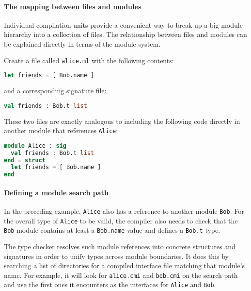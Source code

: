 \hypertarget{the-mapping-between-files-and-modules}{%
\paragraph{The mapping between files and
modules}\label{the-mapping-between-files-and-modules}}

Individual compilation units provide a convenient way to break up a big
module hierarchy into a collection of files. The relationship between
files and modules can be explained directly in terms of the module
system. 

Create a file called \passthrough{\lstinline!alice.ml!} with the
following contents:

\begin{lstlisting}[language=Caml]
let friends = [ Bob.name ]
\end{lstlisting}

and a corresponding signature file:

\begin{lstlisting}[language=Caml]
val friends : Bob.t list
\end{lstlisting}

These two files are exactly analogous to including the following code
directly in another module that references
\passthrough{\lstinline!Alice!}:

\begin{lstlisting}[language=Caml]
module Alice : sig
  val friends : Bob.t list
end = struct
  let friends = [ Bob.name ]
end
\end{lstlisting}

\hypertarget{defining-a-module-search-path}{%
\paragraph{Defining a module search
path}\label{defining-a-module-search-path}}

In the preceding example, \passthrough{\lstinline!Alice!} also has a
reference to another module \passthrough{\lstinline!Bob!}. For the
overall type of \passthrough{\lstinline!Alice!} to be valid, the
compiler also needs to check that the \passthrough{\lstinline!Bob!}
module contains at least a \passthrough{\lstinline!Bob.name!} value and
defines a \passthrough{\lstinline!Bob.t!} type.

The type checker resolves such module references into concrete
structures and signatures in order to unify types across module
boundaries. It does this by searching a list of directories for a
compiled interface file matching that module's name. For example, it
will look for \passthrough{\lstinline!alice.cmi!} and
\passthrough{\lstinline!bob.cmi!} on the search path and use the first
ones it encounters as the interfaces for \passthrough{\lstinline!Alice!}
and \passthrough{\lstinline!Bob!}.

